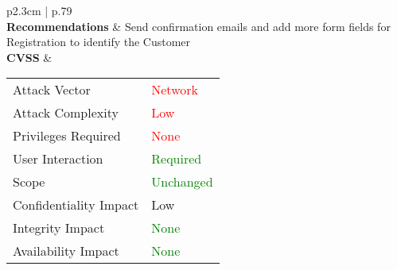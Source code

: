\begin{longtable}[l]{p{2.3cm} | p{.79\linewidth}}
    \\
    \textbf{Recommen\-dations} &
        Send confirmation emails and add more form fields for Registration to identify the Customer
    \\ \hline
    \textbf{CVSS} &
        \begin{tabular}[t]{@{}l | l}
            Attack Vector           & \textcolor{red}{Network} \\
            Attack Complexity       & \textcolor{red}{Low} \\
            Privileges Required     & \textcolor{red}{None} \\
            User Interaction        & \textcolor{Green}{Required} \\
            Scope                   & \textcolor{Green}{Unchanged} \\
            Confidentiality Impact  & \textcolor{BurntOrange}{Low} \\
            Integrity Impact        & \textcolor{Green}{None} \\
            Availability Impact     & \textcolor{Green}{None}
        \end{tabular}
    \\
    \hline
\end{longtable}
\clearpage

